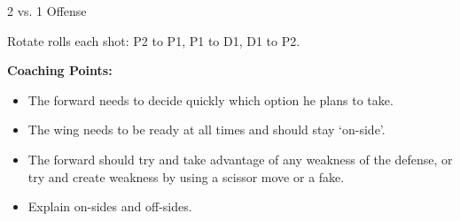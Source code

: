 \begin{evenBlock}{2 vs. 1 Offense}
\begin{minipage}[t]{\linewidth}
\begin{minipage}{.6\linewidth}
        \vspace{3pt}
        
        Rotate rolls each shot: P2 to P1, P1 to D1, D1 to P2.

        \vspace{10pt}
        
        \textbf{Coaching Points:}
        \begin{itemize}
        \setlength{\itemsep}{0pt}
        \setlength{\parskip}{0pt}
        \setlength{\parsep}{0pt}
        \item The forward needs to decide quickly which option he plans to take.
        \item The wing needs to be ready at all times and should stay `on-side'.
        \item The forward should try and take advantage of any weakness of the defense, or try and create weakness by using a scissor move or a fake.
        \item Explain on-sides and off-sides.
        \end{itemize}

    \end{minipage}
\end{minipage}

\end{evenBlock}